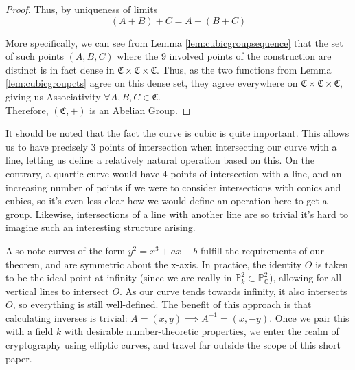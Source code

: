 \begin{proof}
Thus, by uniqueness of limits
\[
	(A+B)+C = A+(B+C)
\]


More specifically, we can see from Lemma \ref{lem:cubicgroupsequence} that the set of
such points $(A,B,C)$ where the 9 involved points of the construction are distinct
is in fact dense in $\mathfrak{C} \times \mathfrak{C} \times \mathfrak{C}$. Thus,
as the two functions from Lemma \ref{lem:cubicgroupcts} agree on this
dense set, they agree everywhere on $\mathfrak{C} \times \mathfrak{C} \times \mathfrak{C}$,
giving us Associativity $\forall A,B,C \in \mathfrak{C}$.\\

Therefore, $(\mathfrak{C},+)$ is an Abelian Group.
\end{proof}

It should be noted that the fact the curve is cubic is quite important.
This allows us to have precisely 3 points of intersection when intersecting
our curve with a line, letting us define a relatively natural
operation based on this. On the contrary, a quartic curve would have 4
points of intersection with a line, and an increasing number of points
if we were to consider intersections with conics and cubics, so 
it's even less clear how we would define an operation here to get a group.
Likewise, intersections of a line with another line are so trivial
it's hard to imagine such an interesting structure arising.

Also note curves of the form $y^2 = x^3 + ax + b$ fulfill the requirements
of our theorem, and are symmetric about the x-axis. In practice,
the identity $O$ is taken to be the ideal point at infinity (since we are
really in $\mathbb{P}^2_k \subset \mathbb{P}^2_\mathbb{C}$), allowing
for all vertical lines to intersect $O$. As our curve tends towards
infinity, it also intersects $O$, so everything is still well-defined.
The benefit of this approach is that calculating inverses is trivial:
$A=(x,y) \implies A^{-1} = (x, -y)$. Once we pair this with a field $k$
with desirable number-theoretic properties, we enter the realm of
cryptography using elliptic curves, and travel far outside the
scope of this short paper.
